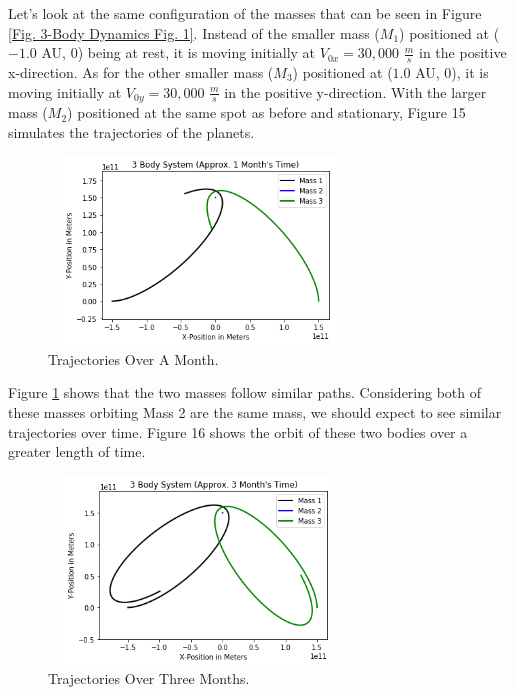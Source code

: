 \documentclass[twocolumn]{article}
\begin{document}
Let's look at the same configuration of the masses that can be seen in Figure \ref{Fig. 3-Body Dynamics Fig. 1}. Instead of the smaller mass ($M_1$) positioned at ($-1.0$ AU, 0) being at rest, it is moving initially at $V_{0x}=30,000$ $\frac{m}{s}$ in the positive x-direction. As for the other smaller mass ($M_3$) positioned at ($1.0$ AU, 0), it is moving initially at $V_{0y}=30,000$ $\frac{m}{s}$ in the positive y-direction. With the larger mass ($M_2$) positioned at the same spot as before and stationary, Figure 15 simulates the trajectories of the planets.
\begin{figure}[h]
    \centering
    \includegraphics[width=8cm, height=5cm]{Figures/3-Body Dynamics (3).png}
    \caption{\small{Trajectories Over A Month.}}
    \label{Fig. 3-Body Dynamics Fig. 3}
\end{figure}
\par \noindent
Figure \ref{Fig. 3-Body Dynamics Fig. 3} shows that the two masses follow similar paths. Considering both of these masses orbiting Mass 2 are the same mass, we should expect to see similar trajectories over time. Figure 16 shows the orbit of these two bodies over a greater length of time.
\begin{figure}[h]
    \centering
    \includegraphics[width=8cm, height=5cm]{Figures/3-Body Dynamics (4).png}
    \caption{\small{Trajectories Over Three Months.}}
    \label{Fig. 3-Body Dynamics Fig. 4}
\end{figure}
\end{document}
